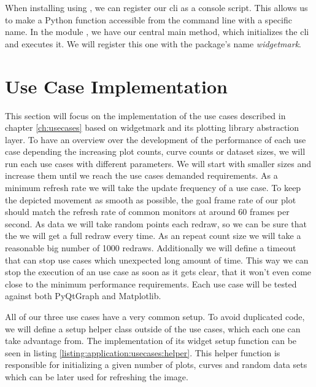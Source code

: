 When installing  using
, we can register our \gls{cli} as a console
script. This allows us to make a Python function accessible from the command
line with a specific name. In the module , we have
our central main method, which initializes the \gls{cli} and executes it. We
will register this one with the package's name \emph{widgetmark}.







\section{Use Case Implementation}

This section will focus on the implementation of the use cases described in
chapter \ref{ch:usecases} based on widgetmark and its plotting library
abstraction layer. To have an overview over the development of the performance
of each use case depending the increasing plot counts, curve counts or dataset
sizes, we will run each use cases with different parameters. We will start with
smaller sizes and increase them until we reach the use cases demanded
requirements. As a minimum refresh rate we will take the update frequency of a
use case. To keep the depicted movement as smooth as possible, the goal frame
rate of our plot should match the refresh rate of common monitors at around 60
frames per second. As data we will take random points each redraw, so we can be
sure that the we will get a full redraw every time. As an repeat count size we
will take a reasonable big number of 1000 redraws. Additionally we will define a
timeout that can stop use cases which unexpected long amount of time. This way
we can stop the execution of an use case as soon as it gets clear, that it won't
even come close to the minimum performance requirements. Each use case will be
tested against both PyQtGraph and Matplotlib.

All of our three use cases have a very common setup. To avoid duplicated code,
we will define a setup helper class outside of the use cases, which each one can
take advantage from. The implementation of its widget setup function can be seen
in listing \ref{listing:application:usecases:helper}. This helper function is
responsible for initializing a given number of plots, curves and random data
sets which can be later used for refreshing the image.


